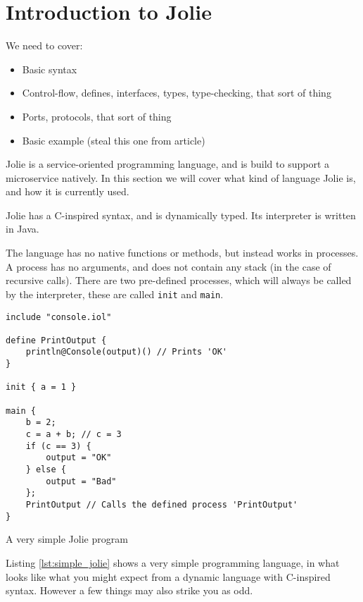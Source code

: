 
\section{Introduction to Jolie}

We need to cover:

\begin{itemize}
\item Basic syntax
\item Control-flow, defines, interfaces, types, type-checking, that sort of
thing
\item Ports, protocols, that sort of thing
\item Basic example (steal this one from article)
\end{itemize}


Jolie is a service-oriented programming language, and is build to support a
microservice natively. In this section we will cover what kind of language
Jolie is, and how it is currently used.

Jolie has a C-inspired syntax, and is dynamically typed. Its interpreter is
written in Java.

The language has no native functions or methods, but instead works in
processes. A process has no arguments, and does not contain any stack (in the
case of recursive calls). There are two pre-defined processes, which will
always be called by the interpreter, these are called \verb!init! and
\verb!main!.

\begin{listing}[H]
\begin{verbatim}
include "console.iol"

define PrintOutput {
    println@Console(output)() // Prints 'OK'
}

init { a = 1 }

main {
    b = 2;
    c = a + b; // c = 3
    if (c == 3) {
        output = "OK"
    } else {
        output = "Bad"
    };
    PrintOutput // Calls the defined process 'PrintOutput'
}
\end{verbatim}
\caption{A very simple Jolie program}
\label{lst:simple_jolie}
\end{listing}

Listing \ref{lst:simple_jolie} shows a very simple programming language, in
what looks like what you might expect from a dynamic language with C-inspired
syntax. However a few things may also strike you as odd.

